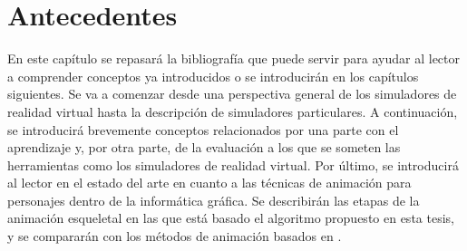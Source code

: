 \chapter{Antecedentes} 
\label{cap:related}

En este capítulo se repasará la bibliografía que puede servir para ayudar al lector a comprender conceptos ya introducidos o se  introducirán en los capítulos siguientes. Se va a comenzar desde una perspectiva general de los simuladores de realidad virtual hasta la descripción de simuladores particulares. A continuación, se introducirá brevemente conceptos relacionados por una parte con el aprendizaje y, por otra parte, de la evaluación a los que se someten las herramientas como los simuladores de realidad virtual. Por último, se introducirá al lector en el estado del arte en cuanto a las técnicas de animación para personajes dentro de la informática gráfica. Se describirán las etapas de la animación esqueletal en las que está basado el algoritmo propuesto en esta tesis, y se compararán con los métodos de animación basados en  .


